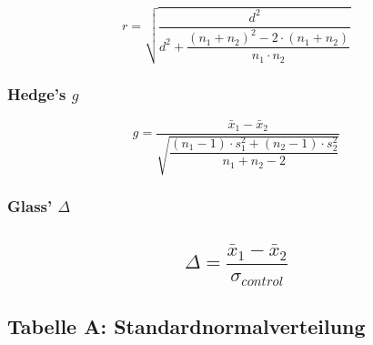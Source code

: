 \documentclass[
]{article}
\begin{document}
\[r = \sqrt{\frac{d^2}{d^2 + \dfrac{(n_1 + n_2)^2 - 2 \cdot (n_1 + n_2)}{n_1 \cdot n_2}}}\]

\subsubsection{\texorpdfstring{Hedge's
\(g\)}{Hedge's g}}\label{hedges-g}

\[g = \frac{\bar{x}_1 - \bar{x}_2}{\sqrt{\dfrac{(n_1 - 1) \cdot s_1^2 + (n_2 - 1) \cdot s_2^2}{n_1 + n_2 - 2}}}\]

\subsubsection{\texorpdfstring{Glass'
\(\Delta\)}{Glass' \textbackslash Delta}}\label{glass-delta}

\subsection{\texorpdfstring{\[\Delta = \frac{\bar{x}_1 - \bar{x}_2}{\sigma_{control}}\]}{\textbackslash Delta = \textbackslash frac\{\textbackslash bar\{x\}\_1 - \textbackslash bar\{x\}\_2\}\{\textbackslash sigma\_\{control\}\}}}\label{delta-fracbarx_1---barx_2sigma_control}

\newpage

\subsection{Tabelle A:
Standardnormalverteilung}\label{tabelle-a-standardnormalverteilung}
\end{document}
